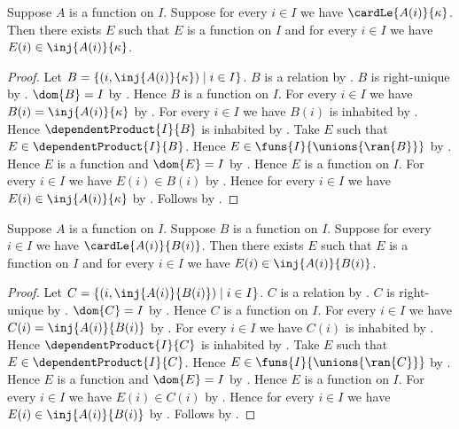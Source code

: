\begin{theorem}\label{indexed_family_uniform_injections}
    Suppose $A$ is a function on $I$.
    Suppose for every $i\in I$ we have $\cardLe{A(i)}{\kappa}$.
    Then there exists $E$ such that $E$ is a function on $I$ and
        for every $i\in I$ we have $E(i)\in\inj{A(i)}{\kappa}$.
\end{theorem}
\begin{proof}
    Let $B=\{(i,\inj{A(i)}{\kappa})\mid i\in I\}$.
    $B$ is a relation by .
    $B$ is right-unique by .
    $\dom{B}=I$ by .
    Hence $B$ is a function on $I$.
    For every $i\in I$ we have $B(i)=\inj{A(i)}{\kappa}$
        by .
    For every $i\in I$ we have $B(i)$ is inhabited
        by .
    Hence $\dependentProduct{I}{B}$ is inhabited
        by .
    Take $E$ such that $E\in\dependentProduct{I}{B}$.
    Hence $E\in\funs{I}{\unions{\ran{B}}}$
        by .
    Hence $E$ is a function and $\dom{E}=I$
        by .
    Hence $E$ is a function on $I$.
    For every $i\in I$ we have $E(i)\in B(i)$
        by .
    Hence for every $i\in I$ we have
        $E(i)\in\inj{A(i)}{\kappa}$ by \auto.
    Follows by \auto.
\end{proof}

\begin{theorem}\label{indexed_family_variable_injections}
    Suppose $A$ is a function on $I$.
    Suppose $B$ is a function on $I$.
    Suppose for every $i\in I$ we have $\cardLe{A(i)}{B(i)}$.
    Then there exists $E$ such that $E$ is a function on $I$ and
        for every $i\in I$ we have $E(i)\in\inj{A(i)}{B(i)}$.
\end{theorem}
\begin{proof}
    Let $C=\{(i,\inj{A(i)}{B(i)})\mid i\in I\}$.
    $C$ is a relation by .
    $C$ is right-unique by .
    $\dom{C}=I$ by .
    Hence $C$ is a function on $I$.
    For every $i\in I$ we have $C(i)=\inj{A(i)}{B(i)}$
        by .
    For every $i\in I$ we have $C(i)$ is inhabited
        by .
    Hence $\dependentProduct{I}{C}$ is inhabited
        by .
    Take $E$ such that $E\in\dependentProduct{I}{C}$.
    Hence $E\in\funs{I}{\unions{\ran{C}}}$
        by .
    Hence $E$ is a function and $\dom{E}=I$
        by .
    Hence $E$ is a function on $I$.
    For every $i\in I$ we have $E(i)\in C(i)$
        by .
    Hence for every $i\in I$ we have
        $E(i)\in\inj{A(i)}{B(i)}$ by \auto.
    Follows by \auto.
\end{proof}


